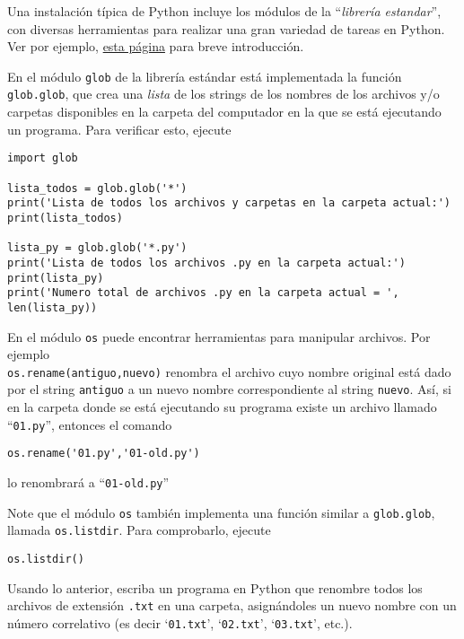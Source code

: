 \documentclass[11pt]{exam}
\begin{document}
\begin{questions}
\item Una instalación típica de Python incluye los módulos de la ``\textit{librería estandar}'', con diversas herramientas para realizar una gran variedad de tareas en Python. Ver por ejemplo, \href{https://docs.python.org/es/3/library/index.html}{esta página} para breve introducción.

\item En el módulo \texttt{glob} de la librería estándar está implementada la función \texttt{glob.glob}, que crea una \textit{lista} de los strings de los nombres de los archivos y/o carpetas disponibles en la carpeta del computador en la que se está ejecutando un programa. Para verificar esto, ejecute

\begin{verbatim}
import glob

lista_todos = glob.glob('*')
print('Lista de todos los archivos y carpetas en la carpeta actual:')
print(lista_todos)

lista_py = glob.glob('*.py')
print('Lista de todos los archivos .py en la carpeta actual:')
print(lista_py)
print('Numero total de archivos .py en la carpeta actual = ', len(lista_py))
\end{verbatim}

\item En el módulo \texttt{os} puede encontrar herramientas para manipular archivos. Por ejemplo \\ \texttt{os.rename(antiguo,nuevo)} renombra el archivo cuyo nombre original está dado por el string \texttt{antiguo} a un nuevo nombre correspondiente al string \texttt{nuevo}. Así, si en la carpeta donde se está ejecutando su programa existe un archivo llamado ``\texttt{01.py}'', entonces el comando 
\begin{verbatim}
os.rename('01.py','01-old.py')
\end{verbatim}

lo renombrará a ``\texttt{01-old.py}''

\item Note que el módulo \texttt{os} también implementa una función similar a \texttt{glob.glob}, llamada \texttt{os.listdir}. Para comprobarlo, ejecute
\begin{verbatim}
os.listdir()
\end{verbatim}

\item Usando lo anterior, escriba un programa en Python que renombre todos los archivos de extensión \texttt{.txt} en una carpeta, asignándoles un nuevo nombre con un número correlativo (es decir `\texttt{01.txt}', `\texttt{02.txt}', `\texttt{03.txt}', etc.).
\end{questions}
\end{document}
